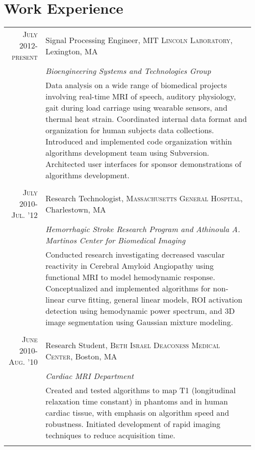\documentclass[letterpaper,11pt]{article}
\begin{document}
\section{Work Experience}
\begin{tabular}{r|p{14.5cm}}
    \textsc{July 2012-present} & Signal Processing Engineer, \textsc{MIT Lincoln Laboratory}, Lexington, MA \\&\emph{Bioengineering Systems and Technologies Group}\\&\footnotesize{Data analysis on a wide range of biomedical projects involving real-time MRI of speech, auditory physiology, gait during load carriage using wearable sensors, and thermal heat strain. Coordinated internal data format and organization for human subjects data collections. Introduced and implemented code organization within algorithms development team using Subversion. Architected user interfaces for sponsor demonstrations of algorithms development. }\\\multicolumn{2}{c}{} \vspace{-0.2cm}\\
\textsc{July 2010-Jul. '12} & Research Technologist, \textsc{Massachusetts General Hospital}, Charlestown, MA \\&\emph{Hemorrhagic Stroke Research Program and Athinoula A. Martinos Center for Biomedical Imaging}\\&\footnotesize{Conducted research investigating decreased vascular reactivity in Cerebral Amyloid Angiopathy using functional MRI to model hemodynamic response. Conceptualized and implemented algorithms for non-linear curve fitting, general linear models, ROI activation detection using hemodynamic power spectrum, and 3D image segmentation using Gaussian mixture modeling. }\\\multicolumn{2}{c}{} \vspace{-0.2cm}\\
\textsc{June 2010-Aug. '10} & Research Student, \textsc{Beth Israel Deaconess Medical Center}, Boston, MA \\&\emph{Cardiac MRI Department}\\&\footnotesize{Created and tested algorithms to map T1 (longitudinal relaxation time constant) in phantoms and in human cardiac tissue, with emphasis on algorithm speed and robustness. Initiated development of rapid imaging techniques to reduce acquisition time.}\\\multicolumn{2}{c}{} \vspace{-0.2cm} \\
\end{tabular}
\end{document}
